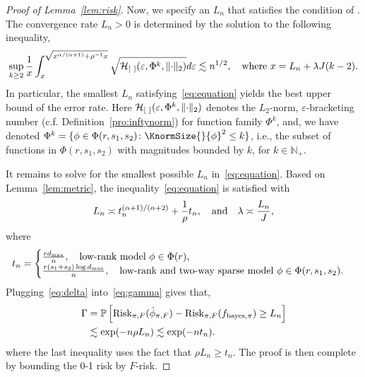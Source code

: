 \documentclass[11pt]{article}
\theoremstyle{plain}
\theoremstyle{definition}
\def\bayespif{f_{\textup{bayes},\pi}}
\def\riskF{\textup{Risk}_{\pi,F}}
\begin{document}
\begin{proof}[Proof of Lemma~\ref{lem:risk}]
Now, we specify an  $L_n$ that satisfies the condition of \citet[Theorem 3]{shen1994convergence}. The convergence rate $L_n>0$ is determined by the solution to the following inequality,
\begin{equation}\label{eq:equation}
\sup_{k\geq 2}{1\over x}\int_{x}^{\sqrt{x^{\alpha/(\alpha+1)}+\rho^{-1}x}}\sqrt{\mathcal{H}_{[\ ]}(\varepsilon, \Phi^{k},\lVert\cdot\rVert_2)}d\varepsilon \lesssim n^{1/2}, \quad \text{where }x=L_n+\lambda J(k-2).
\end{equation}
In particular, the smallest $L_n$ satisfying~\eqref{eq:equation} yields the best upper bound of the error rate. Here $\mathcal{H}_{[\ ]}(\varepsilon, \Phi^{k}, \lVert\cdot\rVert_2)$ denotes the $L_2$-norm, $\varepsilon$-bracketing number (c.f. Definition~\ref{pro:inftynorm}) for function family $\Phi^{k}$, and, we have denoted $\Phi^{k}=\{\phi\in\Phi(r,s_1,s_2)\colon \KnormSize{}{\phi}^2\leq k\}$, i.e., the subset of functions in $\Phi(r,s_1,s_2)$ with magnitudes bounded by $k$, for $k\in\mathbb{N}_{+}$.

It remains to solve for the smallest possible $L_n$ in~\eqref{eq:equation}. Based on Lemma~\ref{lem:metric}, the inequality~\eqref{eq:equation} is satisfied with 
\begin{equation}\label{eq:delta}
L_n\asymp  t_n^{(\alpha+1)/(\alpha+2)}+{1\over \rho} t_n, \quad \text{and}\quad \lambda \asymp {L_n\over J},
\end{equation}
where
\[
t_n=\begin{cases}
{rd_{\max}\over n}, \quad \text{low-rank model $\phi\in\Phi(r)$,}\\
{r(s_1+s_2)\log d_{\max}\over n}, \quad \text{low-rank and two-way sparse model $\phi\in\Phi(r,s_1,s_2)$.}\\
\end{cases}
\]
Plugging~\eqref{eq:delta} into~\eqref{eq:gamma} gives that, 
\begin{align}\label{eq:tail}
\Gamma&=\mathbb{P}\left[\riskF(\hat \phi_{\pi,F}) - \riskF(\bayespif)  \geq L_n \right]\\
&\lesssim \exp(-n\rho L_n) \lesssim \exp(-nt_n).
\end{align}
where the last inequality uses the fact that $\rho L_n\geq t_n$. The proof is then complete by bounding the 0-1 risk by $F$-risk. 


\end{proof}
\end{document}
